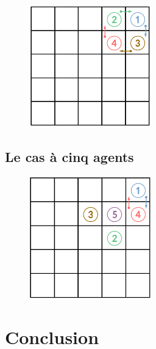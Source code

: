 \documentclass[a4paper, 12pt, french]{article}
\begin{document}
\begin{figure}[h]
	\centering
	\includegraphics[width=200px]{images/4_agents.png}
\end{figure}

\subsection{Le cas à cinq agents}

\begin{figure}[h]
	\centering
	\includegraphics[width=200px]{images/5_agents.png}
\end{figure}

\section{Conclusion}
\end{document}
